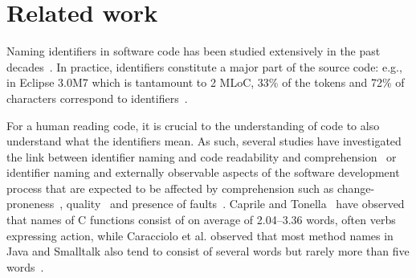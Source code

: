 \documentclass[conference]{IEEEtran}
\newcommand{\quotes}[1]{\textit{``#1''}}
\begin{document}
\section{Related work}
Naming identifiers in software code has been studied extensively in the past decades~\cite{AmanASK15,AvidanF17,Beniamini,ButlerWYS10,HofmeisterSH17,LunguK13,ScannielloR13,TramontanaRS14,AnquetilL98,BuseW10,CaprileT00,LawrieMFB07,ScalabrinoVPO16,TakangGM96,Teasley}. 
In practice, identifiers constitute a major part of the source code: e.g., in Eclipse 3.0M7 which is tantamount to 2 MLoC, 33\% of the tokens and 72\% of characters correspond to identifiers~\cite{Deissenbock}. 

For a human reading code, it is crucial to the understanding of code to also understand what the identifiers mean. As such, several studies have investigated the link between identifier naming and code readability and comprehension~\cite{AvidanF17,HofmeisterSH17,LawrieMFB07,TakangGM96,Teasley} or identifier naming and externally observable aspects of the software development process that are expected to be affected by comprehension such as change-proneness~\cite{AmanASK15}, quality~\cite{ButlerWYS10,LunguK13} and presence of faults~\cite{ScannielloR13,TramontanaRS14}.
Caprile and Tonella~\cite{CaprileTonella} have observed that names of C functions consist of on average of 2.04--3.36 words, often verbs expressing action, while Caracciolo et al. observed that most method names in Java and Smalltalk also tend to consist of several words but rarely more than five words~\cite{Caracciolo}.
\end{document}
